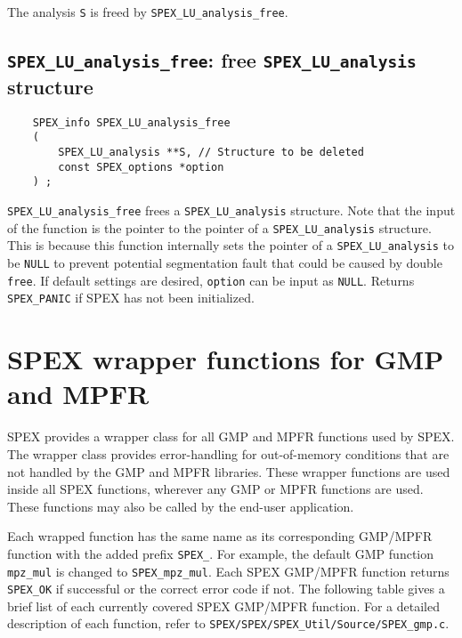 \documentclass[12pt]{report}
\theoremstyle{definition}
\begin{document}
The analysis \verb|S| is freed by \verb|SPEX_LU_analysis_free|.

\cprotect\subsection{\verb|SPEX_LU_analysis_free|: free \verb|SPEX_LU_analysis| structure}
\label{ss:LU_analysis_free}

\begin{mdframed}[userdefinedwidth=6in]
{\footnotesize
\begin{verbatim}
    SPEX_info SPEX_LU_analysis_free
    (
        SPEX_LU_analysis **S, // Structure to be deleted
        const SPEX_options *option
    ) ;
\end{verbatim}
} \end{mdframed}


\verb|SPEX_LU_analysis_free| frees a \verb|SPEX_LU_analysis| structure.
Note that the input of the function is the pointer to the pointer of a
\verb|SPEX_LU_analysis| structure. This is because this function internally
sets the pointer of a \verb|SPEX_LU_analysis| to be \verb|NULL| to prevent
potential segmentation fault that could be caused by double \verb|free|.
If default settings are desired, \verb|option| can be input as \verb|NULL|.
Returns \verb|SPEX_PANIC| if SPEX has not been initialized.

\section{SPEX wrapper functions for GMP and MPFR}

SPEX provides a wrapper class for all GMP and MPFR functions used by SPEX.
The wrapper class provides error-handling for out-of-memory conditions
that are not handled by the GMP and MPFR libraries.  These wrapper functions
are used inside all SPEX functions, wherever any GMP or MPFR functions are
used.  These functions may also be called by the end-user application.

Each wrapped function has the same name as its corresponding GMP/MPFR function
with the added prefix \verb|SPEX_|. For example, the default GMP function
\verb|mpz_mul| is changed to \verb|SPEX_mpz_mul|. Each SPEX GMP/MPFR function
returns \verb|SPEX_OK| if successful or the correct error code if not. The
following table gives a brief list of each currently covered SPEX GMP/MPFR
function. For a detailed description of each function, refer to
\verb|SPEX/SPEX/SPEX_Util/Source/SPEX_gmp.c|.
\end{document}
